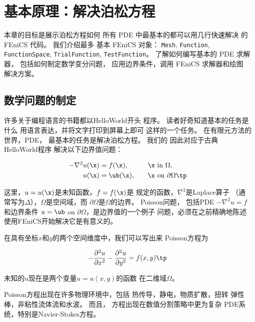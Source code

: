 \chapter{基本原理：解决泊松方程}
\label{ch:fundamentals}

\begin{summary}
本章的目标是展示泊松方程如何
所有 PDE 中最基本的都可以用几行快速解决
的 FEniCS 代码。 我们介绍最多
基本 FEniCS 对象：
\texttt{Mesh}, \texttt{Function}, \texttt{FunctionSpace}, \texttt{TrialFunction}, \texttt{TestFunction}。
了解如何编写基本的 PDE 求解器，
包括如何制定数学变分问题，
应用边界条件，调用 FEniCS 求解器和绘图
解决方案。
\end{summary}


\section{数学问题的制定}
\label{ftut:poisson1:bvp}

许多关于编程语言的书籍都以HelloWorld开头
程序。 读者好奇知道基本的任务是什么
用语言表达，并将文字打印到屏幕上即可
这样的一个任务。 在有限元方法的世界，PDE，
最基本的任务是解决泊松方程。 我们的
因此对应于古典HelloWorld程序
解决以下边界值问题：

\begin{alignat}{2}
- \nabla^2 u(\x) &= f(\x),\quad &&\x\mbox{ in } \Omega,
\label{ftut:poisson1}\\
u(\x) &= \ub(\x),\quad &&\x\mbox{ on } \partial \Omega\tp \label{ch:poisson0:bc}
\end{alignat}

这里，$u = u(\x)$是未知函数，$f = f(\x)$是
规定的函数，$\nabla^2$是Laplace算子
（通常写为$\Delta$），$\Omega$是空间域，而
$\partial \Omega$是$\Omega$的边界。 Poisson问题，
包括PDE $-\nabla^2u = f$和边界条件
$u = \ub$ on $\partial \Omega$，是边界值的一个例子
问题，必须在之前精确地陈述
使用FEniCS开始解决它是有意义的。

在具有坐标$x$和$y$的两个空间维度中，我们可以写出来
Poisson方程为

\begin{equation}
- {\partial^2 u\over\partial x^2} -
{\partial^2 u\over\partial y^2} = f(x,y)\tp
\end{equation}

未知的$u$现在是两个变量$u = u(x,y)$的函数
在二维域$\Omega$。

Poisson方程出现在许多物理环境中，包括
热传导，静电，物质扩散，扭转
弹性棒，非粘性流体流和水波。 而且，
方程出现在数值分割策略中更为复杂
PDE系统，特别是Navier-Stokes方程。


